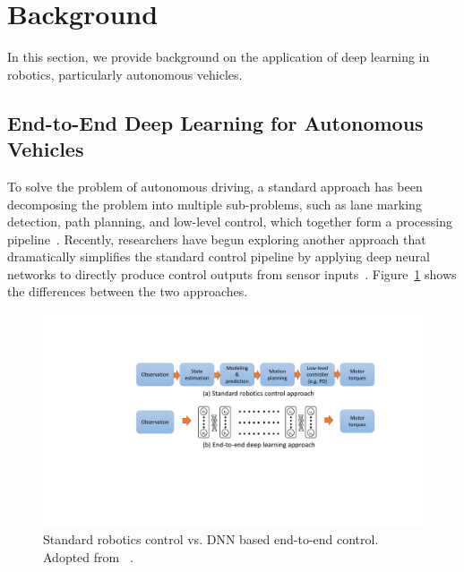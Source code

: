 \section{Background} \label{sec:background}

In this section, we provide background on the application of deep
learning in robotics, particularly autonomous vehicles. 


\subsection{End-to-End Deep Learning for Autonomous Vehicles}


To solve the problem of autonomous driving, a standard approach has
been decomposing the problem into multiple sub-problems,
such as lane marking detection, path planning, and low-level
control, which together form a processing pipeline~\cite{Bojarski2016}.
Recently, researchers have begun exploring another approach that dramatically
simplifies the standard control pipeline by applying deep neural
networks to directly produce control outputs from sensor
inputs~\cite{Levine2016}. Figure~\ref{fig:end-to-end-control}
shows the differences between the two approaches.

\begin{figure}[h]
  \centering
  \includegraphics[width=.5\textwidth]{figs/endtoend_redrawn}
  \caption{Standard robotics control vs. DNN based end-to-end
    control. Adopted from ~\cite{Levine2017cs294}.}
  \label{fig:end-to-end-control}
\end{figure}

